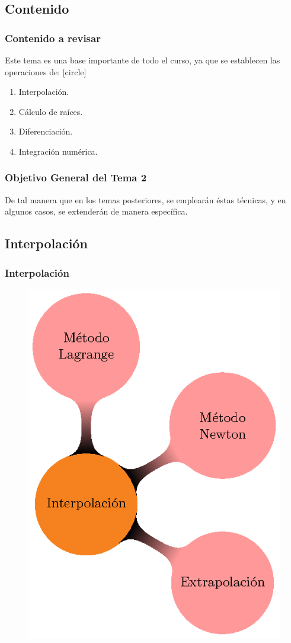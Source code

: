 \subsection{Contenido}
\begin{frame}
\frametitle{Contenido a revisar}
Este tema es una base importante de todo el curso, ya que se establecen las operaciones de:
[circle]
\begin{enumerate}[<+->]
\item Interpolación.
\item Cálculo de raíces.
\item Diferenciación.
\item Integración numérica.
\end{enumerate}
\end{frame}
\begin{frame}
\frametitle{Objetivo General del Tema 2}
De tal manera que en los temas posteriores, se emplearán éstas técnicas, y en algunos casos, se extenderán de manera específica.
\end{frame}
\subsection*{Interpolación}
\begin{frame}[fragile]
\frametitle{Interpolación}
\begin{figure}
    \centering
    \includegraphics[scale=0.8]{Imagenes/MapaMental_Tema2_02.eps}
\end{figure}
\end{frame}
